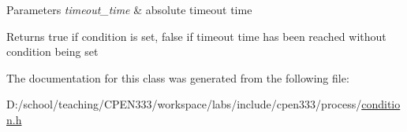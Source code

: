 \begin{DoxyParams}{Parameters}
{\em timeout\+\_\+time} & absolute timeout time \\
\hline
\end{DoxyParams}
\begin{DoxyReturn}{Returns}
{\ttfamily true} if condition is set, {\ttfamily false} if timeout time has been reached without condition being set 
\end{DoxyReturn}


The documentation for this class was generated from the following file\+:\begin{DoxyCompactItemize}
\item 
D\+:/school/teaching/\+C\+P\+E\+N333/workspace/labs/include/cpen333/process/\hyperlink{process_2condition_8h}{condition.\+h}\end{DoxyCompactItemize}
